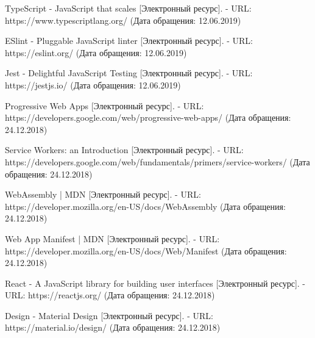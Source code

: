 \begingroup
\renewcommand{\section}[2]{\anonsection{Библиографический список}}
\begin{thebibliography}{00}

  TypeScript - JavaScript that scales
  [Электронный ресурс]. - URL: https://www.typescriptlang.org/
  (Дата обращения: 12.06.2019)

  ESlint - Pluggable JavaScript linter
  [Электронный ресурс]. - URL: https://eslint.org/
  (Дата обращения: 12.06.2019)

  Jest - Delightful JavaScript Testing
  [Электронный ресурс]. - URL: https://jestjs.io/
  (Дата обращения: 12.06.2019)

  Progressive Web Apps
  [Электронный ресурс]. - URL: https://developers.google.com/web/progressive-web-apps/
  (Дата обращения: 24.12.2018)

  Service Workers: an Introduction
  [Электронный ресурс]. - URL: https://developers.google.com/web/fundamentals/primers/service-workers/
  (Дата обращения: 24.12.2018)

  WebAssembly | MDN
  [Электронный ресурс]. - URL: https://developer.mozilla.org/en-US/docs/WebAssembly
  (Дата обращения: 24.12.2018)

  Web App Manifest | MDN
  [Электронный ресурс]. - URL: https://developer.mozilla.org/en-US/docs/Web/Manifest
  (Дата обращения: 24.12.2018)

  React - A JavaScript library for building user interfaces
  [Электронный ресурс]. - URL: https://reactjs.org/
  (Дата обращения: 24.12.2018)

  Design - Material Design
  [Электронный ресурс]. - URL: https://material.io/design/
  (Дата обращения: 24.12.2018)

\end{thebibliography}
\endgroup

\clearpage